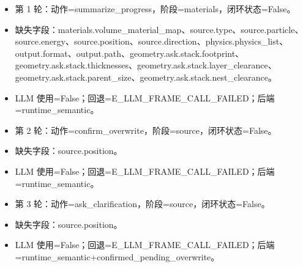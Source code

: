 \documentclass[11pt]{ctexart}
\begin{document}
\begin{itemize}
\item 第 1 轮：动作=summarize\_progress，阶段=materials，闭环状态=False。
\item 缺失字段：materials.volume\_material\_map、source.type、source.particle、source.energy、source.position、source.direction、physics.physics\_list、output.format、output.path、geometry.ask.stack.footprint、geometry.ask.stack.thicknesses、geometry.ask.stack.layer\_clearance、geometry.ask.stack.parent\_size、geometry.ask.stack.nest\_clearance。
\item LLM 使用=False；回退=E\_LLM\_FRAME\_CALL\_FAILED；后端=runtime\_semantic。
\item 第 2 轮：动作=confirm\_overwrite，阶段=source，闭环状态=False。
\item 缺失字段：source.position。
\item LLM 使用=False；回退=E\_LLM\_FRAME\_CALL\_FAILED；后端=runtime\_semantic。
\item 第 3 轮：动作=ask\_clarification，阶段=source，闭环状态=False。
\item 缺失字段：source.position。
\item LLM 使用=False；回退=E\_LLM\_FRAME\_CALL\_FAILED；后端=runtime\_semantic+confirmed\_pending\_overwrite。
\end{itemize}
\end{document}
